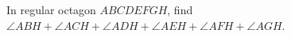 In regular octagon $ ABCDEFGH $, find $\angle ABH+\angle ACH+\angle ADH+\angle AEH+\angle AFH+\angle AGH $.
